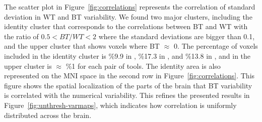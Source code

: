 \documentclass[conference]{IEEEtran}
\begin{document}
\begin{figure}[b]
  \end{figure}
  

The scatter plot in Figure~\ref{fig:correlations} represents the correlation of standard deviation in WT and BT variability.
We found two major clusters, including the identity cluster that corresponds to the correlations
between BT and WT with the ratio of $0.5 < BT/WT < 2$ where the standard deviations are bigger than 0.1,
and the upper cluster that shows voxels where BT $\approx$ 0.
The percentage of voxels included in the identity cluster is \%9.9 in \fslspm, \%17.3 in \fslafni, and \%13.8 in \afnispm,
and in the upper cluster is $\approx$ \%1 for each pair of tools.
The identity area is also represented on the MNI space in the second row in Figure~\ref{fig:correlations}.
This figure shows the spatial localization of the parts of the brain that BT variability is correlated with the numerical variability.
This refines the presented results in Figure~\ref{fig:unthresh-varmaps},
which indicates how correlation is uniformly distributed across the brain.
  
\end{document}
